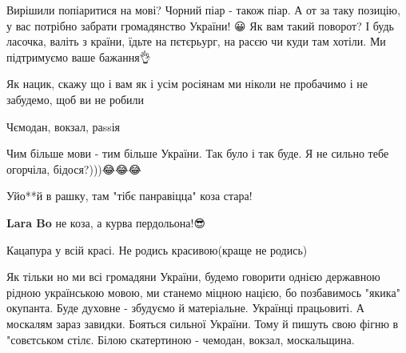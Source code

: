 \begin{itemize}
Вирішили попіаритися на мові? Чорний піар - також піар. А от за таку позицію, у вас потрібно забрати громадянство України! 😀 Як вам такий поворот?
І будь ласочка, валіть з країни, їдьте на пєтєрьург, на расєю чи куди там хотіли. Ми підтримуємо ваше бажання👌


Як нацик, скажу що і вам як і усім росіянам ми ніколи не пробачимо і не забудемо, щоб ви не робили


Чємодан, вокзал, раssія


Чим більше мови - тим більше України. Так було і так буде. Я не сильно тебе огорчіла, бідося?)))😂😂😂💙💛


Уйо**й в рашку, там "тібє панравіцца" коза стара!

\begin{itemize}

\textbf{Lara Bo} не коза, а курва пердольона!😎
\end{itemize}


Кацапура у всій красі. Не родись красивою(краще не родись)


Як тільки но ми всі громадяни України, будемо говорити однією державною рідною українською мовою, ми станемо міцною нацією, бо позбавимось "якика" окупанта. Буде духовне - збудуємо й матеріальне. Українці працьовиті. А москалям зараз завидки. Бояться сильної України. Тому й пишуть свою фігню в "совєтськом стілє. Білою скатертиною - чемодан, вокзал, москальщина.


\end{itemize}
